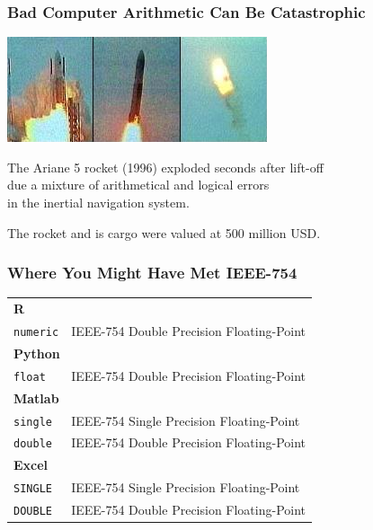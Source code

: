 \begin{frame}

\frametitle{Bad Computer Arithmetic Can Be Catastrophic}

\begin{center}

\vspace{\fill}

\includegraphics[scale=0.5]{figures/explosion.jpg}

\vspace{\fill}

The Ariane 5 rocket (1996) exploded seconds after lift-off \\ due a mixture of
arithmetical and logical errors \\ in the inertial navigation system.

\vspace{\fill}

The rocket and is cargo were valued at 500 million USD.

\end{center}

\end{frame}


\begin{frame}

\frametitle{Where You Might Have Met IEEE-754}

\vspace{\fill}

\begin{tabular}{ll}
\multicolumn{2}{l}{\textbf{R}} \\
\texttt{numeric} & IEEE-754 Double Precision Floating-Point \\
\multicolumn{2}{l}{\textbf{Python}} \\
\texttt{float} &  IEEE-754 Double Precision Floating-Point \\
\multicolumn{2}{l}{\textbf{Matlab}} \\
\texttt{single} & IEEE-754 Single Precision Floating-Point \\
\texttt{double} & IEEE-754 Double Precision Floating-Point \\
\multicolumn{2}{l}{\textbf{Excel}} \\
\texttt{SINGLE} & IEEE-754 Single Precision Floating-Point \\
\texttt{DOUBLE} & IEEE-754 Double Precision Floating-Point
\end{tabular}

\vspace{\fill}

\end{frame}

